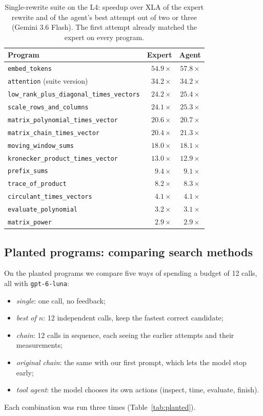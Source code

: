 \documentclass[conference]{IEEEtran}
\begin{document}
\begin{table}[t]
  \centering
  \caption{Single-rewrite suite on the L4: speedup over XLA of the expert
  rewrite and of the agent's best attempt out of two or three (Gemini 3.6
  Flash). The first attempt already matched the expert on every program.}
  \label{tab:suite}
  \begin{tabular}{@{}lrr@{}}
    \toprule
    Program & Expert & Agent \\
    \midrule
    \texttt{embed\_tokens} & $54.9\times$ & $57.8\times$ \\
    \texttt{attention} (suite version) & $34.2\times$ & $34.2\times$ \\
    \texttt{low\_rank\_plus\_diagonal\_times\_vectors} & $24.2\times$ & $25.4\times$ \\
    \texttt{scale\_rows\_and\_columns} & $24.1\times$ & $25.3\times$ \\
    \texttt{matrix\_polynomial\_times\_vector} & $20.6\times$ & $20.7\times$ \\
    \texttt{matrix\_chain\_times\_vector} & $20.4\times$ & $21.3\times$ \\
    \texttt{moving\_window\_sums} & $18.0\times$ & $18.1\times$ \\
    \texttt{kronecker\_product\_times\_vector} & $13.0\times$ & $12.9\times$ \\
    \texttt{prefix\_sums} & $9.4\times$ & $9.1\times$ \\
    \texttt{trace\_of\_product} & $8.2\times$ & $8.3\times$ \\
    \texttt{circulant\_times\_vectors} & $4.1\times$ & $4.1\times$ \\
    \texttt{evaluate\_polynomial} & $3.2\times$ & $3.1\times$ \\
    \texttt{matrix\_power} & $2.9\times$ & $2.9\times$ \\
    \bottomrule
  \end{tabular}
\end{table}

\subsection{Planted programs: comparing search methods}
On the planted programs we compare five ways of spending a budget of 12
calls, all with \texttt{gpt-6-luna}:
\begin{itemize}
  \item \emph{single}: one call, no feedback;
  \item \emph{best of $n$}: 12 independent calls, keep the fastest correct candidate;
  \item \emph{chain}: 12 calls in sequence, each seeing the earlier attempts and their measurements;
  \item \emph{original chain}: the same with our first prompt, which lets the model stop early;
  \item \emph{tool agent}: the model chooses its own actions (inspect, time, evaluate, finish).
\end{itemize}
Each combination was run three times (Table~\ref{tab:planted}).
\end{document}
